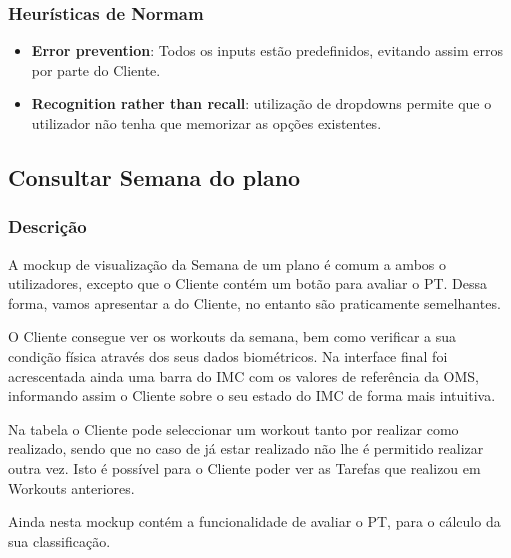 \subsubsection{Heurísticas de Normam}
\begin{itemize}
    \item \textbf{Error prevention}: Todos os inputs estão predefinidos, evitando assim erros por parte do Cliente.
    \item \textbf{Recognition rather than recall}: utilização de dropdowns permite que o utilizador não tenha que memorizar as opções existentes.
\end{itemize}

\subsection{Consultar Semana do plano}
\label{subsec:semana}

\subsubsection{Descrição}
\hspace{5mm} A mockup de visualização da Semana de um plano é comum a ambos o utilizadores, excepto que o Cliente contém um botão para avaliar o PT. Dessa forma, vamos apresentar a do Cliente, no entanto são praticamente semelhantes. 

\hspace{5mm} O Cliente consegue ver os workouts da semana, bem como verificar a sua condição física através dos seus dados biométricos. Na interface final foi acrescentada ainda uma barra do IMC com os valores de referência da OMS, informando assim o Cliente sobre o seu estado do IMC de forma mais intuitiva.

\hspace{5mm} Na tabela o Cliente pode seleccionar um workout tanto por realizar como realizado, sendo que no caso de já estar realizado não lhe é permitido realizar outra vez. Isto é possível para o Cliente poder ver as Tarefas que realizou em Workouts anteriores.

\hspace{5mm} Ainda nesta mockup contém a funcionalidade de avaliar o PT, para o cálculo da sua classificação.

